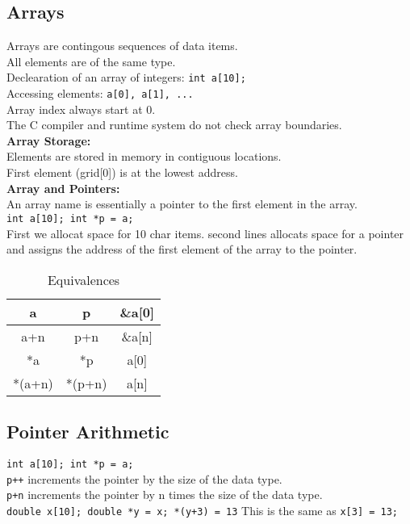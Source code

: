 \documentclass[answers,12pt,addpoints]{exam}
\begin{document}
\subsection{Arrays}
Arrays are contingous sequences of data items. \\
All elements are of the same type. \\
Declearation of an array of integers: \texttt{int a[10];} \\
Accessing elements: \texttt{a[0], a[1], ...} \\
Array index always start at 0. \\
The C compiler and runtime system do not check array boundaries. \\
\textbf{Array Storage:} \\
Elements are stored in memory in contiguous locations. \\
First element (grid[0]) is at the lowest address. \\
\textbf{Array and Pointers:} \\
An array name is essentially a pointer to the first element in the array. \\
\texttt{int a[10]; int *p = a;} \\
First we allocat space for 10 char items. second lines allocats space for a pointer and assigns the address of the first element of the array to the pointer. \\
\begin{table}[h!]
\centering
\begin{tabular}{|c|c|c|}
\hline
a & p & \&a[0] \\ \hline
a+n & p+n & \&a[n] \\ \hline
*a & *p & a[0] \\ \hline
*(a+n) & *(p+n) & a[n] \\ \hline
\end{tabular}
\caption{Equivalences}
\label{tab:string-functions}
\end{table}

\subsection{Pointer Arithmetic}
\texttt{int a[10]; int *p = a;} \\
\texttt{p++} increments the pointer by the size of the data type. \\
\texttt{p+n} increments the pointer by n times the size of the data type. \\
\texttt{double x[10]; double *y = x; *(y+3) = 13}
This is the same as \texttt{x[3] = 13;} \\
\end{document}
